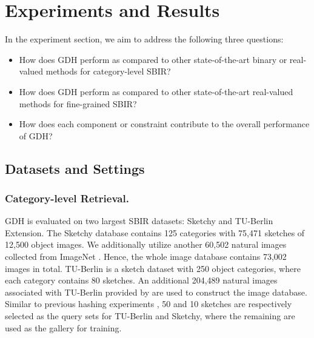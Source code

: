 \documentclass[runningheads]{llncs}
\begin{document}
\section{Experiments and Results}
In the experiment section, we aim to address the following
three questions:
\begin{itemize}
\vspace{-1ex}
\item How does GDH perform as compared to other state-of-the-art binary or real-valued methods for category-level SBIR?
\item How does GDH perform as compared to other state-of-the-art real-valued methods for fine-grained SBIR?
\item How does each component or constraint contribute to the overall performance of GDH?
\vspace{-1ex}
\end{itemize}

\subsection{Datasets and Settings}
\vspace{-1ex}
\subsubsection{Category-level Retrieval.} GDH is evaluated on two largest SBIR datasets: Sketchy \cite{SangkloyBHH16} and TU-Berlin \cite{EitzHA12} Extension. The Sketchy database contains 125 categories with 75,471 sketches of 12,500 object images. We additionally utilize another 60,502 natural images \cite{LiuSSLS17} collected from ImageNet \cite{deng2009imagenet}. Hence, the whole image database contains 73,002 images in total. 
TU-Berlin is a sketch dataset with 250 object categories, where each category contains 80 sketches. An additional 204,489 natural images associated with TU-Berlin provided by \cite{0008LZRWC16} are used to construct the image database. Similar to previous hashing experiments \cite{LiuSSLS17}, 50 and 10 sketches are respectively selected as the query sets for TU-Berlin and Sketchy, where the remaining are used as the gallery for training. 
\end{document}
